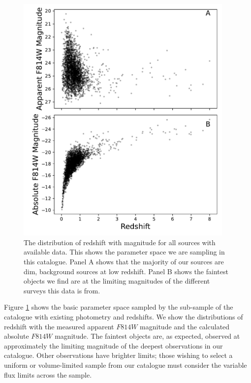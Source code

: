 {\begin{figure}
    \centering
    \includegraphics[width=0.95\textwidth]{Chapter2/figures/fig12.pdf}
    \caption[The distribution of redshift with magnitude for all sources with available data.]{The distribution of redshift with magnitude for all sources with available data. This shows the parameter space we are sampling in this catalogue. Panel A shows that the majority of our sources are dim, background sources at low redshift. Panel B shows the faintest objects we find are at the limiting magnitudes of the different surveys this data is from.}
    \label{fig:redshift-mag-dist}
\end{figure}

Figure \ref{fig:redshift-mag-dist} shows the basic parameter space sampled by the sub-sample of the catalogue with existing photometry and redshifts. We show the distributions of redshift with the measured apparent $F814W$ magnitude and the calculated absolute $F814W$ magnitude. The faintest objects are, as expected, observed at approximately the limiting magnitude of the deepest observations in our catalogue. Other observations have brighter limits; those wishing to select a uniform or volume-limited sample from our catalogue must consider the variable flux limits across the sample.

}
